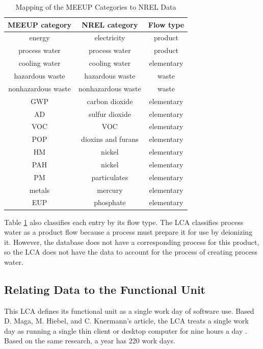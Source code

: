 \documentclass[final,journal,10pt,letterpaper,oneside,twocolumn,compsoc]%
{IEEEtran}
\begin{document}
\begin{table}[t!]
\caption{Mapping of the MEEUP Categories to NREL Data}
\centering
\begin{tabular}{|c|c||c|}
  \hline
  MEEUP category      & NREL category       & Flow type \\
  \hline
  energy              & electricity         & product \\
  process water       & process water       & product \\
  cooling water       & cooling water       & elementary \\
  hazardous waste     & hazardous waste     & waste \\
  nonhazardous waste & nonhazardous waste & waste \\
  GWP                 & carbon dioxide      & elementary \\
  AD                  & sulfur dioxide      & elementary \\
  VOC                 & VOC                 & elementary \\
  POP                 & dioxins and furans  & elementary \\
  HM                  & nickel              & elementary \\
  PAH                 & nickel              & elementary \\
  PM                  & particulates        & elementary \\
  metals              & mercury             & elementary \\
  EUP                 & phosphate           & elementary \\
  \hline
\end{tabular}
\label{tab:2}
\end{table}


Table \ref{tab:2} also classifies each entry by its flow type. The LCA classifies process
water as a product flow because a process must prepare it for use by deionizing
it. However, the database does not have a corresponding process for this
product, so the LCA does not have the data to account for the process of
creating process water.

\subsection{Relating Data to the Functional Unit}
This LCA defines its functional
unit as a single work day of software use. Based D. Maga, M. Hiebel, and C.
Knermann's article, the LCA treats a single work day as running a single thin
client or desktop computer for nine hours a day \cite{maga}. Based on the same
research, a year has 220 work days.
\end{document}
